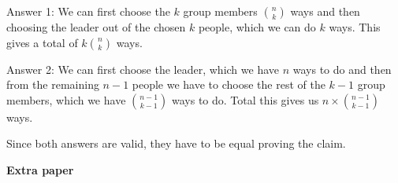 \documentclass[12pt]{article}
\begin{document}
\begin{enumerate}
\begin{enumerate}
Answer 1: We can first choose the $k$ group members $\binom{n}{k}$ ways and then choosing the leader out of the chosen $k$ people, which we can do $k$ ways. This gives a total of $k\binom{n}{k}$ ways.

Answer 2: We can first choose the leader, which we have $n$ ways to do and then from the remaining $n-1$ people we have to choose the rest of the $k-1$ group members, which we have $\binom{n-1}{k-1}$ ways to do. Total this gives us $n\times\binom{n-1}{k-1}$ ways.

Since both answers are valid, they have to be equal proving the claim. 

\end{enumerate}
\end{enumerate}

\newpage
\noindent
\textbf{Extra paper}
%

%
\end{document}
